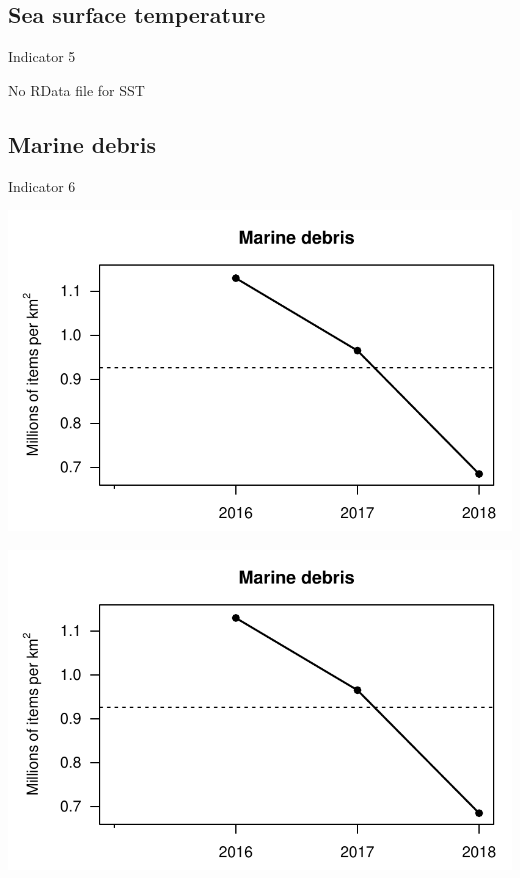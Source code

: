 \documentclass[
  letterpaper,
  oneside,
  open=any]{scrbook}
\begin{document}
\hypertarget{sea-surface-temperature}{%
\subsection{Sea surface temperature}\label{sea-surface-temperature}}

Indicator 5

No RData file for SST

\hypertarget{marine-debris}{%
\subsection{Marine debris}\label{marine-debris}}

Indicator 6

\includegraphics{Report_book_files/Risk_indicators_files/figure-pdf/unnamed-chunk-4-1.pdf}

\includegraphics{Report_book_files/Risk_indicators_files/figure-pdf/unnamed-chunk-5-1.pdf}
\end{document}

